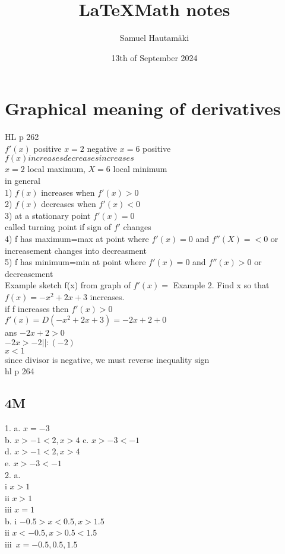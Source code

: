 \documentclass{article}
\title{\LaTeX Math notes}
\author{Samuel Hautamäki}
\date{13th of September 2024}
\begin{document}
  \maketitle
   
  \section{Graphical meaning of derivatives}
  HL p 262\\
  $f'(x)$ positive $x=2$ negative $x=6$ positive\\
  $f(x) increases        decreases      increases$\\
  $x=2$ local maximum, $X=6$ local minimum\\
  in general \\
  1) $f(x)$ increases when $f'(x)>0$\\
  2) $f(x)$ decreases when $f'(x)<0$\\
  3) at a stationary point $f'(x)=0$\\
  called turning point if sign of $f'$ changes\\
  4) f has maximum=max at point where $f'(x)=0$ and $f''(X)=<0$ or increasement 
  changes into decreasment\\
  5) f has minimum=min at point where $f'(x)=0$ and $f''(x)>0$ or decreasement\\
  Example sketch f(x) from graph of $f'(x)=$
  Example 2. Find x so that $f(x)=-x^2+2x+3$ increases.\\
  if f increases then $f'(x)>0$\\
  $f'(x)=D(-x^2+2x+3)=-2x+2+0$\\
  ans $-2x+2>0$\\
  $-2x>-2 ||:(-2)$\\
  $x<1$\\
  since divisor is negative, we must reverse inequality sign\\
  hl p 264\\
  \subsection{4M}
  1. a. $x=-3$\\
  b. $x>-1<2, x>4$
  c. $x>-3<-1$\\
  d. $x>-1<2, x>4$\\
  e. $x>-3<-1$\\
  2. a. \\
  i $x>1$\\
  ii $x>1$\\
  iii $x=1$\\
  b. i $-0.5>x<0.5, x>1.5$\\
  ii $x<-0.5, x>0.5<1.5$\\
  iii $x=-0.5,0.5,1.5$\\
  
  

   
\end{document}
